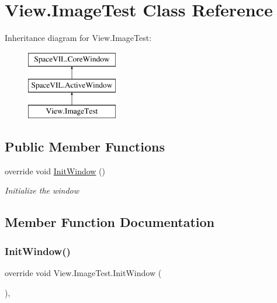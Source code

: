 \hypertarget{class_view_1_1_image_test}{}\section{View.\+Image\+Test Class Reference}
\label{class_view_1_1_image_test}
Inheritance diagram for View.\+Image\+Test\+:\begin{figure}[H]
\begin{center}
\leavevmode
\includegraphics[height=3.000000cm]{class_view_1_1_image_test}
\end{center}
\end{figure}
\subsection*{Public Member Functions}
\begin{DoxyCompactItemize}
\item 
override void \mbox{\hyperlink{class_view_1_1_image_test_aa7b380fa57f08a6628ca45aec3d2254e}{Init\+Window}} ()
\begin{DoxyCompactList}\small\item\em Initialize the window \end{DoxyCompactList}\end{DoxyCompactItemize}


\subsection{Member Function Documentation}
\mbox{\label{class_view_1_1_image_test_aa7b380fa57f08a6628ca45aec3d2254e}} 
\subsubsection{\texorpdfstring{Init\+Window()}{InitWindow()}}
{\footnotesize\ttfamily override void View.\+Image\+Test.\+Init\+Window (\begin{DoxyParamCaption}{ }\end{DoxyParamCaption})\hspace{0.3cm}{\ttfamily [inline]}, {\ttfamily [virtual]}}



